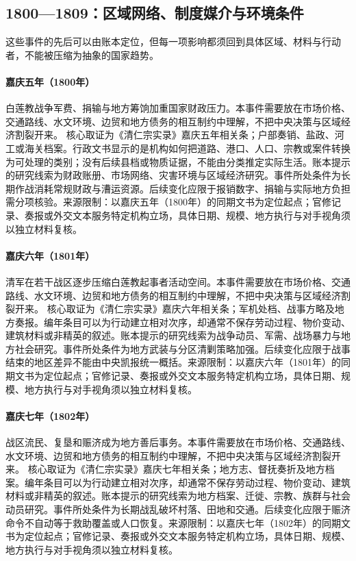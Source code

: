 \subsection{1800—1809：区域网络、制度媒介与环境条件}
这些事件的先后可以由账本定位，但每一项影响都须回到具体区域、材料与行动者，不能被压缩为抽象的国家趋势。
\hypertarget{civic:EQ-1800-WHITE-LOTUS-FINANCE}{}\paragraph{嘉庆五年（1800年）}白莲教战争军费、捐输与地方筹饷加重国家财政压力。本事件需要放在市场价格、交通路线、水文环境、边贸和地方债务的相互制约中理解，不把中央决策与区域经济割裂开来。 核心取证为《清仁宗实录》嘉庆五年相关条；户部奏销、盐政、河工或海关档案。行政文书显示的是机构如何把道路、港口、人口、宗教或案件转换为可处理的类别；没有后续县档或物质证据，不能由分类推定实际生活。账本提示的研究线索为财政账册、市场网络、灾害环境与区域经济研究。事件所处条件为长期作战消耗常规财政与漕运资源。后续变化应限于报销数字、捐输与实际地方负担需分项核验。来源限制：以嘉庆五年（1800年）的同期文书为定位起点；官修记录、奏报或外交文本服务特定机构立场，具体日期、规模、地方执行与对手视角须以独立材料复核。
\hypertarget{civic:EQ-1801-WHITE-LOTUS-SUPPRESSION}{}\paragraph{嘉庆六年（1801年）}清军在若干战区逐步压缩白莲教起事者活动空间。本事件需要放在市场价格、交通路线、水文环境、边贸和地方债务的相互制约中理解，不把中央决策与区域经济割裂开来。 核心取证为《清仁宗实录》嘉庆六年相关条；军机处档、战事方略及地方奏报。编年条目可以为行动建立相对次序，却通常不保存劳动过程、物价变动、建筑材料或非精英的叙述。账本提示的研究线索为战争动员、军需、战场暴力与地方社会研究。事件所处条件为地方武装与分区清剿策略加强。后续变化应限于战事结束的地区差异不能由中央凯报统一概括。来源限制：以嘉庆六年（1801年）的同期文书为定位起点；官修记录、奏报或外交文本服务特定机构立场，具体日期、规模、地方执行与对手视角须以独立材料复核。
\hypertarget{civic:EQ-1802-WAR-REFUGEE-RELIEF}{}\paragraph{嘉庆七年（1802年）}战区流民、复垦和赈济成为地方善后事务。本事件需要放在市场价格、交通路线、水文环境、边贸和地方债务的相互制约中理解，不把中央决策与区域经济割裂开来。 核心取证为《清仁宗实录》嘉庆七年相关条；地方志、督抚奏折及地方档案。编年条目可以为行动建立相对次序，却通常不保存劳动过程、物价变动、建筑材料或非精英的叙述。账本提示的研究线索为地方档案、迁徙、宗教、族群与社会动员研究。事件所处条件为长期战乱破坏村落、田地和交通。后续变化应限于赈济命令不自动等于救助覆盖或人口恢复。来源限制：以嘉庆七年（1802年）的同期文书为定位起点；官修记录、奏报或外交文本服务特定机构立场，具体日期、规模、地方执行与对手视角须以独立材料复核。
